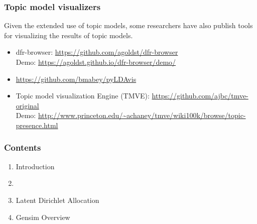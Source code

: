 \documentclass{beamer}
\begin{document}
\begin{frame}

    \frametitle{Topic model visualizers}

	Given the extended use of topic models, some researchers have also publish tools for visualizing the results of topic models.

    \begin{itemize}
  
    	\item dfr-browser: \url{https://github.com/agoldst/dfr-browser} \\
    	Demo: \url{https://agoldst.github.io/dfr-browser/demo/}
    	
    	\item {\color{blue}{\bf pyLDAvis:}} \url{https://github.com/bmabey/pyLDAvis} \\
    	
    	\item Topic model visualization Engine (TMVE): \url{https://github.com/ajbc/tmve-original} \\
    	Demo: \url{http://www.princeton.edu/~achaney/tmve/wiki100k/browse/topic-presence.html} 
    
    \end{itemize}

\end{frame}


\begin{frame}

    \frametitle{Contents}

	\large

    \begin{enumerate}
  
    	\item Introduction
    	\item {\bf \color{blue}{Latent Semantic Indexing}}
    	\item Latent Dirichlet Allocation
    	\item Gensim Overview
    
    \end{enumerate}

\end{frame}

\end{document}
